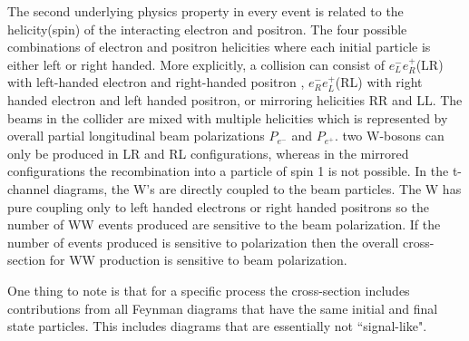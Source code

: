 The second underlying physics property in every event is related to the helicity(spin) of the interacting electron and positron. The four possible combinations of electron and positron helicities where each initial particle is either left or right handed. More explicitly, a collision can consist of  $e^-_L e^+_R$(LR) with left-handed electron and right-handed positron , $e^-_R e^+_L$(RL)  with right handed electron and left handed positron, or mirroring helicities RR and LL.  The beams in the collider are mixed with multiple helicities which is represented by overall partial longitudinal beam polarizations $P_{e^-}$ and $ P_{e^+}$.  two W-bosons can only be produced in LR and RL configurations, whereas in the mirrored configurations the  recombination into a particle of spin 1 is  not possible. In the t-channel diagrams, the W's are directly coupled to the beam particles. The W has pure coupling only to left handed electrons or right handed positrons so the number of  WW events produced are sensitive to the beam polarization\cite{thomson}.  If the number of events produced is sensitive to polarization then the overall cross-section for WW production is sensitive to beam polarization. 

One thing to note is that for a specific process the cross-section includes contributions from all Feynman diagrams that have the same initial and final state particles. This includes diagrams that are essentially not ``signal-like". 











